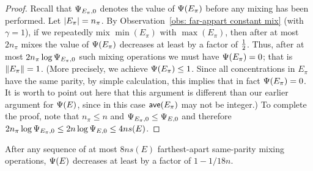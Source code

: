 \begin{proof}
	Recall that ${\Psi}_{E_\pi,0}$ denotes the value of ${\Psi}(E_\pi)$ before any mixing has been performed.
	Let ${|E_\pi|} = n_\pi$.
	By Observation~\ref{obs: far-appart constant mix} (with $\gamma =1$), if we
	repeatedly mix $\min(E_\pi)$ with $\max(E_\pi)$, then after at most $2n_\pi$ mixes
	the value of ${\Psi}(E_\pi)$ decreases at least by a factor of ${\textstyle\frac{1}{2}}$.
	Thus, after at most $2n_\pi\log{{\Psi}_{E_\pi,0}}$ such mixing operations we must have
	${\Psi}(E_\pi) = 0$; that is ${\|E_\pi\|} = 1$.
	(More precisely, we achieve ${\Psi}(E_\pi) \le 1$. Since all concentrations in $E_\pi$
	have the same parity, by simple calculation, this implies that in fact ${\Psi}(E_\pi) = 0$.
	It is worth to point out here that this argument is different than our earlier argument for
	${\Psi}(E)$, since in this case ${\textsf{ave}}(E_\pi)$ may not be integer.)	
	To complete the proof, note that
	$n_\pi\leq n$ and ${\Psi}_{E_\pi,0}\leq{\Psi}_{E,0}$ 
	and therefore $2n_\pi\log{{\Psi}_{E_\pi,0}} \leq 2n\log{{\Psi}_{E,0}} \leq 4ns(E)$.
\end{proof}


\begin{lemma} \label{lem: small mixes}
	After any sequence of at most $8ns(E)$ farthest-apart same-parity 
	mixing operations, ${\Psi}(E)$ decreases at least by a factor of $1 - 1/18n$.
\end{lemma}   

